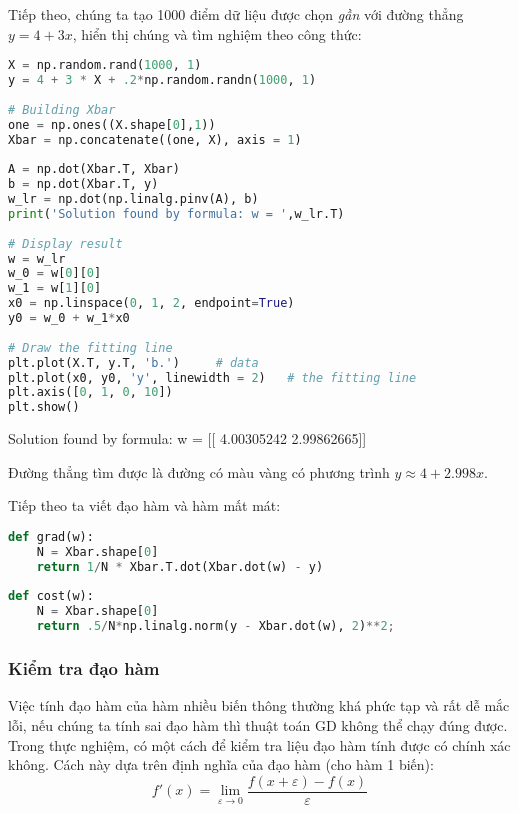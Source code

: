Tiếp theo, chúng ta tạo 1000 điểm dữ liệu được chọn \textit{gần} với đường thẳng $y = 4 + 3x$, hiển thị chúng và tìm nghiệm theo công thức: 
 
 
\begin{lstlisting}[language=Python]
X = np.random.rand(1000, 1) 
y = 4 + 3 * X + .2*np.random.randn(1000, 1) 
 
# Building Xbar  
one = np.ones((X.shape[0],1)) 
Xbar = np.concatenate((one, X), axis = 1) 
 
A = np.dot(Xbar.T, Xbar) 
b = np.dot(Xbar.T, y) 
w_lr = np.dot(np.linalg.pinv(A), b) 
print('Solution found by formula: w = ',w_lr.T) 
 
# Display result 
w = w_lr 
w_0 = w[0][0] 
w_1 = w[1][0] 
x0 = np.linspace(0, 1, 2, endpoint=True) 
y0 = w_0 + w_1*x0 
 
# Draw the fitting line  
plt.plot(X.T, y.T, 'b.')     # data  
plt.plot(x0, y0, 'y', linewidth = 2)   # the fitting line 
plt.axis([0, 1, 0, 10]) 
plt.show() 
\end{lstlisting}
 
    Solution found by formula: w =  [[ 4.00305242  2.99862665]] 
 
 
 
 
Đường thẳng tìm được là đường có màu vàng có phương trình $y \approx 4 + 2.998x$. 
 
Tiếp theo ta viết đạo hàm và hàm mất mát: 
 
 
\begin{lstlisting}[language=Python]
def grad(w): 
    N = Xbar.shape[0] 
    return 1/N * Xbar.T.dot(Xbar.dot(w) - y) 
 
def cost(w): 
    N = Xbar.shape[0] 
    return .5/N*np.linalg.norm(y - Xbar.dot(w), 2)**2; 
\end{lstlisting}
 
 
\subsubsection{Kiểm tra đạo hàm}
Việc tính đạo hàm của hàm nhiều biến thông thường khá phức tạp và rất dễ mắc lỗi, nếu chúng ta tính sai đạo hàm thì thuật toán GD không thể chạy đúng được. Trong thực nghiệm, có một cách để kiểm tra liệu đạo hàm tính được có chính xác không. Cách này dựa trên định nghĩa của đạo hàm (cho hàm 1 biến): 
\begin{equation*} 
f'(x) = \lim_{\varepsilon \rightarrow 0}\frac{f(x + \varepsilon) - f(x)}{\varepsilon} 
\end{equation*} 
 
